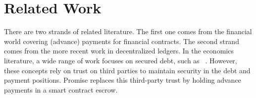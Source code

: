 \documentclass[runningheads]{llncs}
\newcommand{\sys}{Promise\xspace}
\newcommand{\tolgu}[1]{\todo[linecolor=yellow,backgroundcolor=yellow!25,bordercolor=yellow,inline,caption={}]{Todo for Lewis: #1}}
\begin{document}

\section{Related Work}
\label{sec:related}




There are two strands of related literature.
The first one comes from the financial world covering (advance) payments for financial contracts.
The second strand comes from the more recent work in decentralized ledgers.
In the economics literature, a wide range of work focuses on secured debt, such as ~\cite{scott1977bankruptcy,stulz1985analysis}.
However, these concepts rely on trust on third parties to maintain security in the debt and payment positions.
\sys replaces this third-party trust by holding advance payments in a smart contract escrow.
\end{document}
